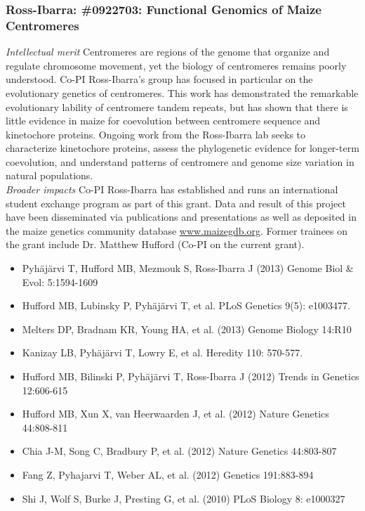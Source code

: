 \subsubsection*{Ross-Ibarra: \#0922703: Functional Genomics of Maize Centromeres}
\emph{Intellectual merit} Centromeres are regions of the genome that organize and regulate chromosome movement, yet the biology of centromeres remains poorly understood. Co-PI Ross-Ibarra's group has focused in particular on the evolutionary genetics of centromeres. This work has demonstrated the remarkable evolutionary lability of centromere tandem repeats, but has shown that there is little evidence in maize for coevolution between centromere sequence and kinetochore proteins. Ongoing work from the Ross-Ibarra lab seeks to characterize kinetochore proteins, assess the phylogenetic evidence for longer-term coevolution, and understand patterns of centromere and genome size variation in natural populations. \\\emph{Broader impacts} Co-PI Ross-Ibarra has established and runs an international student exchange program as part of this grant. Data and result of this project have been disseminated via publications and presentations as well as deposited in the maize genetics community database \url{www.maizegdb.org}. Former trainees on the grant include Dr. Matthew Hufford (Co-PI on the current grant).
 
\begin{itemize}  \itemsep0em
\item Pyh\"aj\"arvi T, Hufford MB, Mezmouk S, Ross-Ibarra J (2013) Genome Biol \& Evol:  5:1594-1609
\item Hufford MB, Lubinsky P, Pyh\"aj\"arvi T, et al. PLoS Genetics 9(5): e1003477.
\item Melters DP, Bradnam KR, Young HA, et al. (2013) Genome Biology 14:R10
\item Kanizay LB, Pyhäjärvi T, Lowry E, et al. Heredity 110: 570-577.
\item Hufford MB, Bilinski P, Pyh\"aj\"arvi T, Ross-Ibarra J (2012) Trends in Genetics 12:606-615
\item Hufford MB, Xun X, van Heerwaarden J, et al. (2012) Nature Genetics 44:808-811
\item Chia J-M, Song C, Bradbury P, et al. (2012) Nature Genetics 44:803-807
\item Fang Z, Pyhajarvi T, Weber AL, et al. (2012) Genetics 191:883-894
\item Shi J, Wolf S, Burke J, Presting G, et al.  (2010) PLoS Biology 8: e1000327
\end{itemize}


